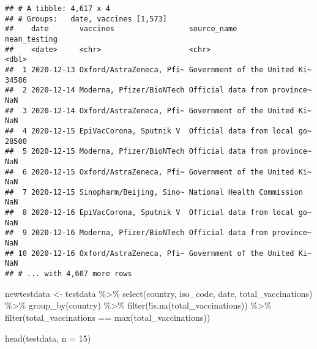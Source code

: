 \documentclass[
]{article}
\newenvironment{Shaded}{\begin{snugshade}}{\end{snugshade}}
\newcommand{\AttributeTok}[1]{\textcolor[rgb]{0.77,0.63,0.00}{#1}}
\newcommand{\DecValTok}[1]{\textcolor[rgb]{0.00,0.00,0.81}{#1}}
\newcommand{\FunctionTok}[1]{\textcolor[rgb]{0.00,0.00,0.00}{#1}}
\newcommand{\NormalTok}[1]{#1}
\newcommand{\OtherTok}[1]{\textcolor[rgb]{0.56,0.35,0.01}{#1}}
\newcommand{\SpecialCharTok}[1]{\textcolor[rgb]{0.00,0.00,0.00}{#1}}
\begin{document}
\begin{verbatim}
## # A tibble: 4,617 x 4
## # Groups:   date, vaccines [1,573]
##    date       vaccines                 source_name                  mean_testing
##    <date>     <chr>                    <chr>                               <dbl>
##  1 2020-12-13 Oxford/AstraZeneca, Pfi~ Government of the United Ki~        34586
##  2 2020-12-14 Moderna, Pfizer/BioNTech Official data from province~          NaN
##  3 2020-12-14 Oxford/AstraZeneca, Pfi~ Government of the United Ki~          NaN
##  4 2020-12-15 EpiVacCorona, Sputnik V  Official data from local go~        28500
##  5 2020-12-15 Moderna, Pfizer/BioNTech Official data from province~          NaN
##  6 2020-12-15 Oxford/AstraZeneca, Pfi~ Government of the United Ki~          NaN
##  7 2020-12-15 Sinopharm/Beijing, Sino~ National Health Commission            NaN
##  8 2020-12-16 EpiVacCorona, Sputnik V  Official data from local go~          NaN
##  9 2020-12-16 Moderna, Pfizer/BioNTech Official data from province~          NaN
## 10 2020-12-16 Oxford/AstraZeneca, Pfi~ Government of the United Ki~          NaN
## # ... with 4,607 more rows
\end{verbatim}

\begin{Shaded}
\begin{Highlighting}[]
\NormalTok{newtestdata }\OtherTok{\textless{}{-}}\NormalTok{ testdata }\SpecialCharTok{\%\textgreater{}\%}
  \FunctionTok{select}\NormalTok{(country, iso\_code, date, total\_vaccinations) }\SpecialCharTok{\%\textgreater{}\%}
  \FunctionTok{group\_by}\NormalTok{(country) }\SpecialCharTok{\%\textgreater{}\%}
  \FunctionTok{filter}\NormalTok{(}\SpecialCharTok{!}\FunctionTok{is.na}\NormalTok{(total\_vaccinations)) }\SpecialCharTok{\%\textgreater{}\%}
  \FunctionTok{filter}\NormalTok{(total\_vaccinations }\SpecialCharTok{==} \FunctionTok{max}\NormalTok{(total\_vaccinations))}

\FunctionTok{head}\NormalTok{(testdata, }\AttributeTok{n =} \DecValTok{15}\NormalTok{)}
\end{Highlighting}
\end{Shaded}
\end{document}
